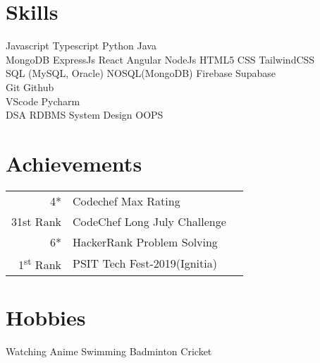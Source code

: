 \documentclass[]{deedy-resume-openfont}
\begin{document}
\begin{minipage}[t]{0.33\textwidth}

\section{Skills}
Javascript \textbullet{} Typescript \textbullet{} Python \textbullet{} Java \\

MongoDB \textbullet{} ExpressJs \textbullet{} React \textbullet{} Angular \textbullet{} NodeJs \textbullet{} HTML5 \textbullet{} CSS \textbullet{} TailwindCSS   \\

SQL (MySQL, Oracle) \textbullet{} NOSQL(MongoDB) \textbullet{} Firebase \textbullet{} Supabase  \\

Git \textbullet{} Github  \\

VScode \textbullet{} Pycharm  \\

DSA \textbullet{} RDBMS \textbullet{} System Design \textbullet{} OOPS  \\



\section{Achievements} 
\begin{tabular}{rll}
4*	     & Codechef Max Rating \\
31st Rank	 & CodeChef Long July Challenge \\
6*	     & HackerRank Problem Solving\\
1\textsuperscript{st} Rank  & PSIT Tech Fest-2019(Ignitia)  \\
\end{tabular}
\sectionsep


\section{Hobbies}
Watching Anime \textbullet{} Swimming \textbullet{} Badminton \textbullet{} Cricket  \\





%
%

\end{minipage} 
\end{document}
